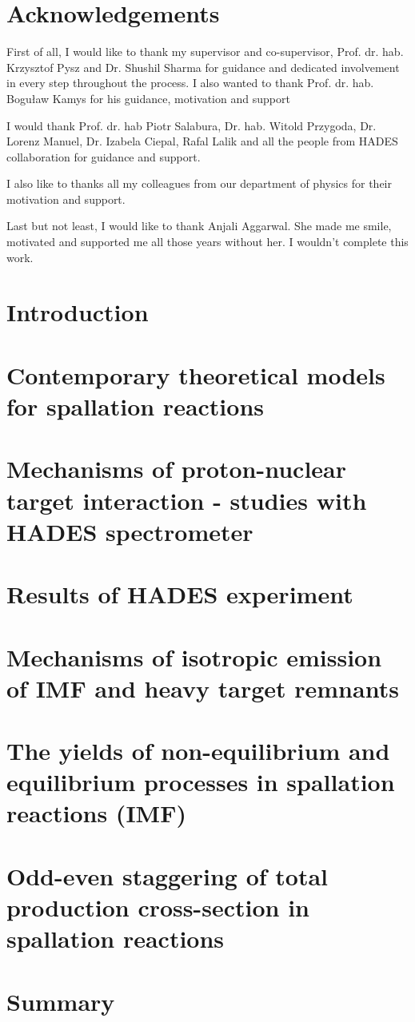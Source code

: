 \documentclass[12pt]{report}
\begin{document}
\chapter*{Acknowledgements}
First of all, I would like to thank my supervisor and co-supervisor, Prof. dr. hab. Krzysztof Pysz and Dr. Shushil Sharma for guidance and dedicated involvement in every step throughout the process. I also wanted to thank Prof. dr. hab. Boguław Kamys for his guidance, motivation and support \par
I would thank Prof. dr. hab Piotr Salabura, Dr. hab. Witold Przygoda, Dr. Lorenz Manuel, Dr. Izabela Ciepal, Rafal Lalik and all the people from HADES collaboration for guidance and support.\par
I also like to thanks all my colleagues from our department of physics for their motivation and support.\par
Last but not least, I would like to thank Anjali Aggarwal. She made me smile, motivated and supported me all those years without her. I wouldn't complete this work.
\chapter{Introduction}\label{chapter1}

 
\chapter{Contemporary theoretical models for spallation reactions}\label{chapter:2}

\chapter{Mechanisms of proton-nuclear target interaction - studies with HADES spectrometer}\label{chapter:3} %

\chapter{Results of HADES experiment}\label{chapter:4}

  \chapter{Mechanisms of isotropic emission of IMF and heavy target remnants}\label{chapter:5}
  
\chapter{The yields of non-equilibrium and equilibrium processes in spallation reactions (IMF)}\label{chapter:6}
 
\chapter{Odd-even staggering of total production cross-section in spallation reactions}\label{chapter:7}
 
\chapter{Summary}

\printbibliography
\end{document}
